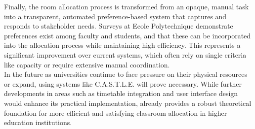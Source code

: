 \documentclass[a4paper, oneside]{article}
\theoremstyle{plain}
\newcommand{\castle}{C{\small.}A{\small.}S{\small.}T{\small.}L{\small.}E{\small.}}
\begin{document}
Finally, the room allocation process is transformed from an opaque, manual task into a transparent, automated preference-based system that captures and responds to stakeholder needs.
Surveys at Ecole Polytechnique demonstrate preferences exist among faculty and students, and that these can be incorporated into the allocation process while maintaining high efficiency.
This represents a significant improvement over current systems, which often rely on single criteria like capacity or require extensive manual coordination.\\

In the future as universities continue to face pressure on their physical resources or expand, using systems like \castle{} will prove necessary.
While further developments in areas such as timetable integration and user interface design would enhance its practical implementation,
already provides a robust theoretical foundation for more efficient and satisfying classroom allocation in higher education institutions.\\
\end{document}
